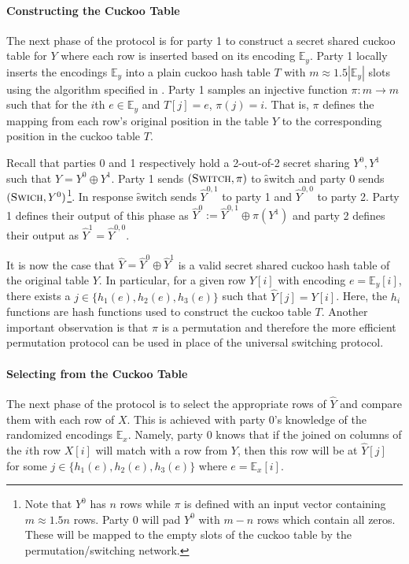\paragraph{Constructing the Cuckoo Table}

The next phase of the protocol is for party 1 to construct a secret shared cuckoo table for $Y$ where each row is inserted based on its encoding $\mathbb{E}_y$. Party 1 locally inserts the encodings $\mathbb{E}_y$ into a plain cuckoo hash table $T$ with $m\approx 1.5|\mathbb{E}_y|$ slots using the algorithm specified in . Party 1 samples an injective function $\pi : m\rightarrow m$ such that for the $i$th $e\in \mathbb{E}_y$ and $T[j]=e$, $\pi(j)=i$. That is, $\pi$ defines the mapping from each row's original position in the table $Y$ to the corresponding position in the cuckoo table $T$.

Recall that parties 0 and 1 respectively hold a 2-out-of-2 secret sharing $Y^0,Y^1$ such that $Y=Y^0\oplus Y^1$. 
Party 1 sends $(\textsc{Switch}, \pi)$ to \f{switch} and party 0 sends $(\textsc{Swich}, Y^0)$\footnote{Note that $Y^0$ has $n$ rows while $\pi$ is defined with an input vector containing $m\approx 1.5n$ rows. Party 0 will pad $Y^0$ with $m-n$ rows which contain all zeros. These will be mapped to the empty slots of the cuckoo table by the permutation/switching network.}. In response \f{switch} sends $\hat Y^{0,1}$ to party 1  and $\hat Y^{0,0}$ to party 2. Party 1 defines their output of this phase as $\hat Y^0:=\hat Y^{0,1} \oplus \pi(Y^1)$ and party 2 defines their output as $\hat Y^{1} =\hat Y^{0,0}$.

It is now the case that $\hat Y = \hat Y^0\oplus \hat Y^1$ is a valid secret shared cuckoo hash table of the original table $Y$. In particular, for a given row $Y[i]$ with encoding $e=\mathbb{E}_y[i]$, there exists a $j\in \{h_1(e),h_2(e), h_3(e)\}$ such that  $\hat Y[j] = Y[i]$. Here, the $h_i$ functions are hash functions used to construct the cuckoo table $T$. Another important observation is that $\pi$ is a permutation and therefore the more efficient permutation protocol can be used in place of the universal switching protocol.

\paragraph{Selecting from the Cuckoo Table}

The next phase of the protocol is to select the appropriate rows of $\hat Y$ and compare them with each row of $X$. This is achieved with party 0's knowledge of the randomized encodings $\mathbb{E}_x$. Namely, party 0 knows that if the joined on columns of the $i$th row $X[i]$ will match with a row from $Y$, then this row will be at $\hat Y[j]$ for some $j\in \{h_1(e),h_2(e), h_3(e)\}$ where  $e=\mathbb{E}_x[i]$. 

